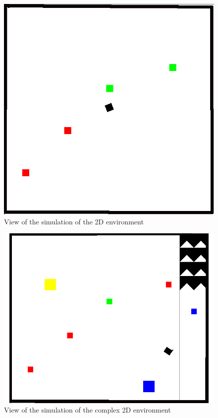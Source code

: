 \documentclass[12pt,svgnames,table]{beamer}
\begin{document}
\begin{frame}
\begin{figure}
  \includegraphics[scale = 0.3]{images/2Dsimple.png}
  \caption{View of the simulation of the 2D environment}
  \label{fig:my-figure}
\end{figure}
\end{frame}
\begin{frame}
\begin{figure}
  \includegraphics[scale = 0.3]{images/2Dcomplex.png}
  \caption{View of the simulation of the complex 2D environment}
  \label{fig:my-figure}
\end{figure}
\end{frame}
\end{document}
